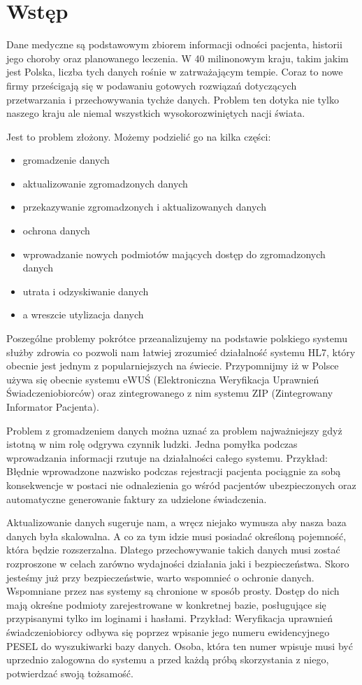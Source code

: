 \section{Wstęp}
\label{cha:wstep}

Dane medyczne są podstawowym zbiorem informacji odności pacjenta, historii jego choroby oraz planowanego leczenia. W 40 milinonowym kraju, takim jakim jest Polska, liczba tych danych rośnie w zatrważającym tempie. Coraz to nowe firmy prześcigają się w podawaniu gotowych rozwiązań dotyczących przetwarzania i przechowywania tychże danych. Problem ten dotyka nie tylko naszego kraju ale niemal wszystkich wysokorozwiniętych nacji świata.

Jest to problem złożony. Możemy podzielić go na kilka części:
\begin{itemize}
	\item gromadzenie danych
	\item aktualizowanie zgromadzonych danych
	\item przekazywanie zgromadzonych i aktualizowanych danych
	\item ochrona danych
	\item wprowadzanie nowych podmiotów mających dostęp do zgromadzonych danych
	\item utrata i odzyskiwanie danych
	\item a wreszcie utylizacja danych
\end{itemize}

Poszególne problemy pokrótce przeanalizujemy na podstawie polskiego systemu służby zdrowia co pozwoli nam łatwiej zrozumieć działalność systemu HL7, który obecnie jest jednym z popularniejszych na świecie. Przypomnijmy iż w Polsce używa się obecnie systemu eWUŚ (Elektroniczna Weryfikacja Uprawnień Świadczeniobiorców) oraz zintegrowanego z nim systemu ZIP (Zintegrowany Informator Pacjenta).

Problem z gromadzeniem danych można uznać za problem najważniejszy gdyż istotną w nim rolę odgrywa czynnik ludzki. Jedna pomyłka podczas wprowadzania informacji rzutuje na działalności całego systemu. Przykład: Błędnie wprowadzone nazwisko podczas rejestracji pacjenta pociągnie za sobą konsekwencje w postaci nie odnalezienia go wśród pacjentów ubezpieczonych oraz automatyczne generowanie faktury za udzielone świadczenia.

Aktualizowanie danych sugeruje nam, a wręcz niejako wymusza aby nasza baza danych była skalowalna. A co za tym idzie musi posiadać określoną pojemność, która będzie rozszerzalna. Dlatego przechowywanie takich danych musi zostać rozproszone w celach zarówno wydajności działania jaki i bezpieczeństwa.
Skoro jesteśmy już przy bezpieczeństwie, warto wspomnieć o ochronie danych. Wspomniane przez nas systemy są chronione w sposób prosty. Dostęp do nich mają okreśne podmioty zarejestrowane w konkretnej bazie, posługujące się przypisanymi tylko im loginami i hasłami. Przykład: Weryfikacja uprawnień świadczeniobiorcy odbywa się poprzez wpisanie jego numeru ewidencyjnego PESEL do wyszukiwarki bazy danych. Osoba, która ten numer wpisuje musi być uprzednio zalogowna do systemu a przed każdą próbą skorzystania z niego, potwierdzać swoją tożsamość.

